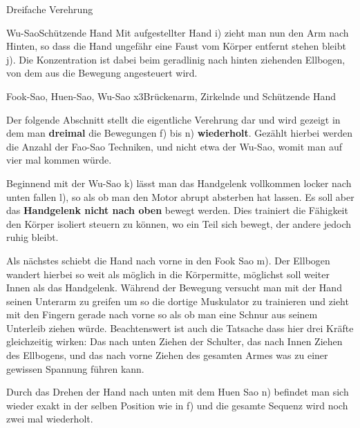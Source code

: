 \begin{WTSatz}{Dreifache Verehrung}
\begin{WTSatzTeil}{Wu-Sao}{Sch\"utzende Hand}
		Mit aufgestellter Hand i) zieht man nun den Arm nach Hinten, so dass die Hand ungef\"ahr eine Faust vom K\"orper entfernt stehen bleibt j). Die Konzentration ist dabei beim geradlinig nach hinten ziehenden Ellbogen, von dem aus die Bewegung angesteuert wird.
		
	\end{WTSatzTeil}
	\begin{WTSatzTeil}{Fook-Sao, Huen-Sao, Wu-Sao x3}{Br\"uckenarm, Zirkelnde und Sch\"utzende Hand}
		
		Der folgende Abschnitt stellt die eigentliche Verehrung dar und wird gezeigt in dem man \textbf{dreimal} die Bewegungen f) bis n) \textbf{wiederholt}. Gez\"ahlt hierbei werden die Anzahl der Fao-Sao Techniken, und nicht etwa der Wu-Sao, womit man auf vier mal kommen w\"urde.

		
		Beginnend mit der Wu-Sao k) l\"asst man das Handgelenk vollkommen locker nach unten fallen l), so als ob man den Motor abrupt absterben hat lassen. Es soll aber das \textbf{Handgelenk nicht nach oben} bewegt werden. Dies trainiert die F\"ahigkeit den K\"orper isoliert steuern zu k\"onnen, wo ein Teil sich bewegt, der andere jedoch ruhig bleibt.

		Als n\"achstes schiebt die Hand nach vorne in den Fook Sao m). Der Ellbogen wandert hierbei so weit als m\"oglich in die K\"orpermitte, m\"oglichst soll weiter Innen als das Handgelenk. W\"ahrend der Bewegung versucht man mit der Hand seinen Unterarm zu greifen um so die dortige Muskulator zu trainieren und zieht mit den Fingern gerade nach vorne so als ob man eine Schnur aus seinem Unterleib ziehen w\"urde. Beachtenswert ist auch die Tatsache dass hier drei Kr\"afte gleichzeitig wirken: Das nach unten Ziehen der Schulter, das nach Innen Ziehen des Ellbogens, und das nach vorne Ziehen des gesamten Armes was zu einer gewissen Spannung f\"uhren kann.


		Durch das Drehen der Hand nach unten mit dem Huen Sao n) befindet man sich wieder exakt in der selben Position wie in f) und die gesamte Sequenz wird noch zwei mal wiederholt.
		

\end{WTSatzTeil}
\end{WTSatz}
